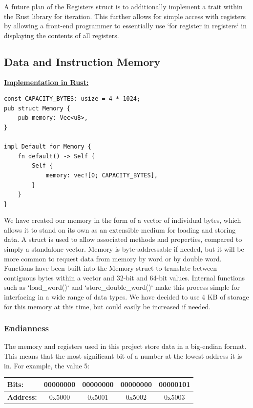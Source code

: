 \documentclass[
    parskip=half,
    fontsize=12pt,
    titlepage=firstiscover,
    toc=bibliography,
    numbers=endperiod
]{scrartcl}
\begin{document}

A future plan of the Registers struct is to additionally implement a
trait within the Rust library for iteration. This further allows for
simple access with registers by allowing a front-end programmer to
essentially use `for register in registers` in displaying the contents
of all registers.

\subsection{Data and Instruction Memory}

\underline{\textbf{Implementation in Rust:}}
\begin{verbatim}
const CAPACITY_BYTES: usize = 4 * 1024;
pub struct Memory {
    pub memory: Vec<u8>,
}

impl Default for Memory {
    fn default() -> Self {
        Self {
            memory: vec![0; CAPACITY_BYTES],
        }
    }
}
\end{verbatim}

We have created our memory in the form of a vector of individual bytes,
which allows it to stand on its own as an extensible medium for loading
and storing data. A struct is used to allow associated methods and
properties, compared to simply a standalone vector. Memory is
byte-addressable if needed, but it will be more common to request data
from memory by word or by double word. Functions have been built into
the Memory struct to translate between contiguous bytes within a vector
and 32-bit and 64-bit values. Internal functions such as `load\_word()`
and `store\_double\_word()` make this process simple for interfacing in
a wide range of data types. We have decided to use 4 KB of storage for
this memory at this time, but could easily be increased if needed.


\subsubsection{Endianness}


The memory and registers used in this project store data in a big-endian
format. This means that the most significant bit of a number at the
lowest address it is in. For example, the value 5:

\begin{tabularx}{\textwidth}{@{}|l|c|c|c|c|@{}}
    \hline
    \textbf{Bits:}    & 00000000 & 00000000 & 00000000 & 00000101 \\\hline
    \textbf{Address:} & 0x5000   & 0x5001   & 0x5002   & 0x5003 \\\hline
\end{tabularx}
\end{document}
